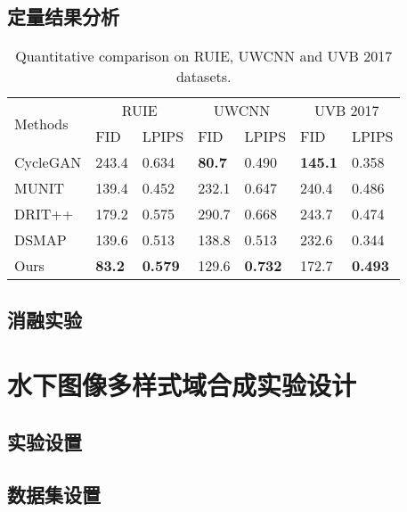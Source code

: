 \subsection{定量结果分析}

\begin{table*}[ht]
\centering
\caption{Quantitative comparison on RUIE, UWCNN and UVB 2017 datasets.}
\begin{tabular}{|p{2cm}|p{1.8cm}|p{1.8cm}|p{1.8cm}|p{1.8cm}|p{1.8cm}|p{1.8cm}|}
\hline
\multirow{2}{*}{Methods} & \multicolumn{2}{c|}{RUIE} & \multicolumn{2}{c|}{UWCNN} & \multicolumn{2}{c|}{UVB 2017} \\ \cline{2-7} 
                         & FID           & LPIPS       & FID           & LPIPS          & FID            & LPIPS          \\ \hline \hline
CycleGAN                 & 243.4         & 0.634       & \textbf{80.7} & 0.490          & \textbf{145.1} & 0.358          \\ \hline
MUNIT                    & 139.4         & 0.452       & 232.1         & 0.647          & 240.4          & 0.486          \\ \hline
DRIT++                   & 179.2         & 0.575       & 290.7         & 0.668          & 243.7          & 0.474          \\ \hline
DSMAP                    & 139.6         & 0.513       & 138.8         & 0.513          & 232.6          & 0.344          \\ \hline
Ours                     & \textbf{83.2} & \textbf{0.579} & 129.6      & \textbf{0.732} & 172.7          & \textbf{0.493} \\ \hline
\end{tabular}
\label{tab:compare}
\end{table*}

\subsection{消融实验}

\section{水下图像多样式域合成实验设计}
\subsection{实验设置}

\subsection{数据集设置}


